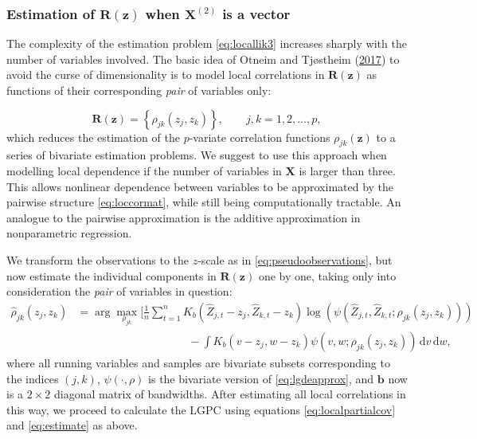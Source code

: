 \documentclass[
  12pt,
  letterpaper]{article}
\newcommand{\X}{\bm{X}}
\newcommand{\Xtwo}{\bm{X}^{(2)}}
\newcommand{\z}{\bm{z}}
\newcommand{\R}{\bm{R}}
\newcommand{\hrho}{\widehat{\rho}}
\newcommand{\hh}{\bm{b}}
\newcommand{\di}{\,\textrm{d}}
\theoremstyle{definition}
\theoremstyle{definition}
\theoremstyle{definition}
\theoremstyle{remark}
\begin{document}
\hypertarget{chap:bivariate}{%
\subsubsection{\texorpdfstring{Estimation of \(\R(\z)\) when \(\Xtwo\) is a vector}{Estimation of \textbackslash R(\textbackslash z) when \textbackslash Xtwo is a vector}}\label{chap:bivariate}}

The complexity of the estimation problem \eqref{eq:locallik3} increases sharply with the number of variables involved. The basic idea of Otneim and Tjøstheim (\protect\hyperlink{ref-otneim2017locally}{2017}) to avoid the curse of dimensionality is to model local correlations in \(\R(\z)\) as functions of their corresponding \emph{pair} of variables only:

\begin{equation}
\R(\z) = \left\{\rho_{jk}(z_j, z_k)\right\}, \qquad j,k = 1, 2, \ldots, p,
\label{eq:loccormat}
\end{equation}
which reduces the estimation of the \(p\)-variate correlation functions \(\rho_{jk}(\z)\) to a series of bivariate estimation problems. We suggest to use this approach when modelling local dependence if the number of variables in \(\X\) is larger than three. This allows nonlinear dependence between variables to be approximated by the pairwise structure \eqref{eq:loccormat}, while still being computationally tractable. An analogue to the pairwise approximation is the additive approximation in nonparametric regression.

We transform the observations to the \(z\)-scale as in \eqref{eq:pseudoobservations}, but now estimate the individual components in \(\R(\z)\) one by one, taking only into consideration the \emph{pair} of variables in question:
\begin{align}
\hrho_{jk}(z_j, z_k) &= \arg\max_{\rho_{jk}} \Bigg[\frac{1}{n} \sum_{t=1}^nK_b(\widehat{Z}_{j,t} - z_j, \widehat{Z}_{k,t}- z_k) \log(\psi(\widehat{Z}_{j,t}, \widehat{Z}_{k,t}; \rho_{jk}(z_j, z_k))) \nonumber \\
& \qquad\qquad\qquad\qquad\qquad - \int K_b(v - z_j, w- z_k)\psi(v,w; \rho_{jk}(z_j,z_k))\di v \di w,
\label{eq:locallik2}
\end{align}
where all running variables and samples are bivariate subsets corresponding to the indices \((j,k)\), \(\psi(\cdot, \rho)\) is the bivariate version of \eqref{eq:lgdeapprox}, and \(\hh\) now is a \(2\times2\) diagonal matrix of bandwidths. After estimating all local correlations in this way, we proceed to calculate the LGPC using equations \eqref{eq:localpartialcov} and \eqref{eq:estimate} as above.
\end{document}
